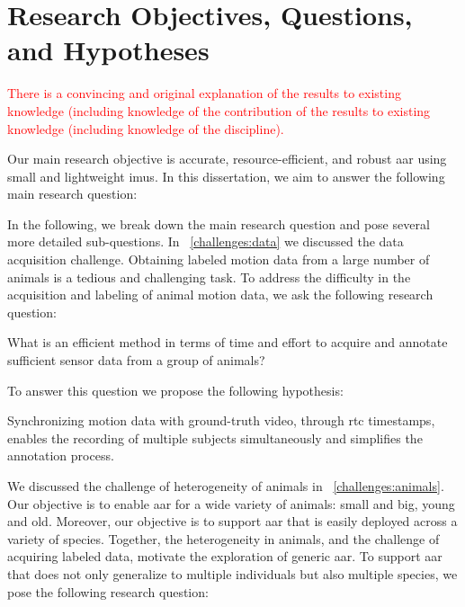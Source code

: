 \section{Research Objectives, Questions, and Hypotheses}
\label{sec:intro_research_objective}
\textcolor{red}{There is a convincing and original explanation of the results to existing knowledge (including knowledge of the contribution of the results to existing knowledge (including knowledge of the discipline).}


Our main research objective is accurate, resource-efficient, and robust \gls{aar} using small and lightweight \glspl{imu}.
In this dissertation, we aim to answer the following main research question:

\mainrq

In the following, we break down the main research question and pose several more detailed sub-questions.
In \sectionname~\ref{challenges:data} we discussed the data acquisition challenge.
Obtaining labeled motion data from a large number of animals is a tedious and challenging task.
To address the difficulty in the acquisition and labeling of animal motion data, we ask the following research question:

\begin{ResearchQuestion}
\label{rq:labeling}
What is an efficient method in terms of time and effort to acquire and annotate sufficient sensor data from a group of animals?
\end{ResearchQuestion}

To answer this question we propose the following hypothesis:

\begin{hypothesis}
\label{hyp:labeling}
    Synchronizing motion data with ground-truth video, through \gls{rtc} timestamps, enables the recording of multiple subjects simultaneously and simplifies the annotation process. 
\end{hypothesis}



We discussed the challenge of heterogeneity of animals in \sectionname~\ref{challenges:animals}.
Our objective is to enable \gls{aar} for a wide variety of animals: small and big, young and old.
Moreover, our objective is to support \gls{aar} that is easily deployed across a variety of species.
Together, the heterogeneity in animals, and the challenge of acquiring labeled data, motivate the exploration of generic \gls{aar}. 
To support \gls{aar} that does not only generalize to multiple individuals but also multiple species, we pose the following research question:

